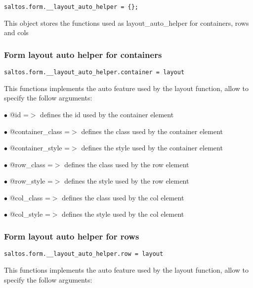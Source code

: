 \documentclass[a4paper]{article}
\begin{document}
\begin{lstlisting}
saltos.form.__layout_auto_helper = {};
\end{lstlisting}

This object stores the functions used as layout\_auto\_helper for containers, rows and cols

\hypertarget{toc781}{}
\subsubsection{Form layout auto helper for containers}

\begin{lstlisting}
saltos.form.__layout_auto_helper.container = layout
\end{lstlisting}

This functions implements the auto feature used by the layout function, allow to specify the
follow arguments:

\begin{compactitem}
\item[\color{myblue}$\bullet$] @id              =$>$ defines the id used by the container element
\item[\color{myblue}$\bullet$] @container\_class =$>$ defines the class used by the container element
\item[\color{myblue}$\bullet$] @container\_style =$>$ defines the style used by the container element
\item[\color{myblue}$\bullet$] @row\_class       =$>$ defines the class used by the row element
\item[\color{myblue}$\bullet$] @row\_style       =$>$ defines the style used by the row element
\item[\color{myblue}$\bullet$] @col\_class       =$>$ defines the class used by the col element
\item[\color{myblue}$\bullet$] @col\_style       =$>$ defines the style used by the col element
\end{compactitem}

\hypertarget{toc782}{}
\subsubsection{Form layout auto helper for rows}

\begin{lstlisting}
saltos.form.__layout_auto_helper.row = layout
\end{lstlisting}

This functions implements the auto feature used by the layout function, allow to specify the
follow arguments:
\end{document}
